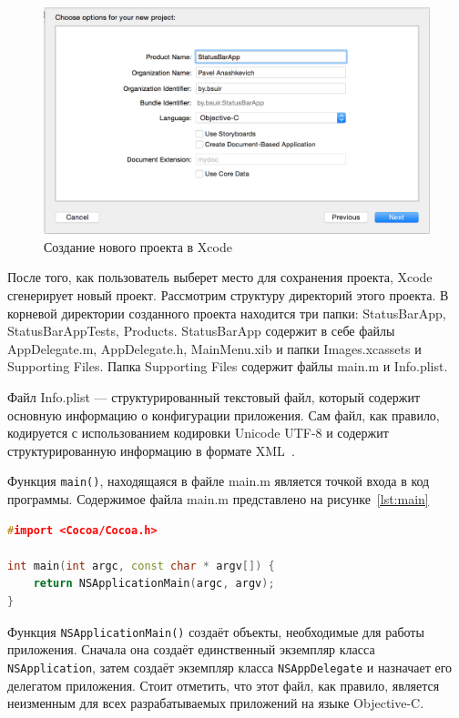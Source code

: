 \begin{figure}[h!]
  \centering
  \includegraphics[width=150mm]{pic/create_project.png}
  \caption{Создание нового проекта в Xcode}
  \label{pic:create_project}
\end{figure}

После того, как пользователь выберет место для сохранения проекта, Xcode
сгенерирует новый проект. Рассмотрим структуру директорий этого проекта.
В корневой директории созданного проекта находится три папки: StatusBarApp,
StatusBarAppTests, Products. StatusBarApp содержит в себе файлы AppDelegate.m,
AppDelegate.h, MainMenu.xib и папки Images.xcassets и Supporting Files. Папка
Supporting Files содержит файлы main.m и Info.plist.

Файл Info.plist --- структурированный текстовый файл, который содержит основную
информацию о конфигурации приложения. Сам файл, как правило, кодируется с
использованием кодировки Unicode UTF-8 и содержит структурированную информацию
в формате XML~\cite{appledoc_plist}.

Функция \texttt{main()}, находящаяся в файле main.m является точкой входа в код программы.
Содержимое файла main.m представлено на рисунке~\ref{lst:main}
\begin{lstlisting}[basicstyle=\scriptsize\ttfamily,
                   numberstyle=\scriptsize\ttfamily,
                   xleftmargin=7mm,
                   language=C++,caption=Содержимое файла main.m,
                   label=lst:main]
#import <Cocoa/Cocoa.h>

int main(int argc, const char * argv[]) {
    return NSApplicationMain(argc, argv);
}
\end{lstlisting}

Функция \texttt{NSApplicationMain()} создаёт объекты, необходимые для работы приложения.
Сначала она создаёт единственный экземпляр класса \texttt{NSApplication}, затем создаёт
экземпляр класса \texttt{NSAppDelegate} и назначает его делегатом приложения.
Стоит отметить, что этот файл, как правило, является неизменным для всех
разрабатываемых приложений на языке Objective-C.

